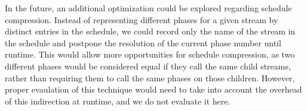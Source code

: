 

In the future, an additional optimization could be explored regarding
schedule compression.  Instead of representing different phases for a
given stream by distinct entries in the schedule, we could record only
the name of the stream in the schedule and postpone the resolution of
the current phase number until runtime.  This would allow more
opportunities for schedule compression, as two different phases would
be considered equal if they call the same child streams, rather than
requiring them to call the same phases on those children.  However,
proper evaulation of this technique would need to take into account
the overhead of this indirection at runtime, and we do not evaluate it
here.
